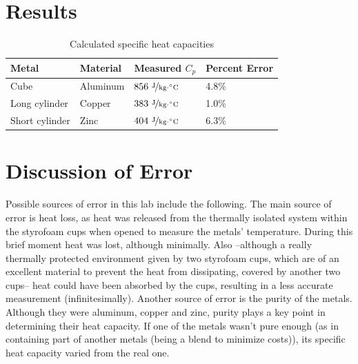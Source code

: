 \documentclass{article}
\begin{document}
\section{Results}

\begin{table}[htbp]
\begin{center}
\footnotesize
\begin{tabular}{llll}
\toprule
 Metal  & Material  & Measured $C_p$ & Percent Error\\                                                      
\midrule
  
    Cube    & Aluminum   & $856\   \nicefrac{ \text{J}}{\text{kg}\cdot {}^{\circ}\text{C}}$ &   4.8\%   \\
    Long cylinder   & Copper     & $383\   \nicefrac{ \text{J}}{\text{kg}\cdot {}^{\circ}\text{C}}$   & 1.0\%   \\
    Short cylinder  & Zinc     & $404\  \nicefrac{ \text{J}}{\text{kg}\cdot {}^{\circ}\text{C}}$  & 6.3\%   \\
    
\bottomrule
\end{tabular}
\end{center}
  \caption{Calculated specific heat capacities}
  \label{tab:font-sizes}
\end{table}


 

\section{Discussion of Error}
Possible sources of error in this lab include the following. 
The main source of error is heat loss, as heat was released from the thermally isolated system within the styrofoam cups when opened to measure the metals' temperature. During this brief moment heat was lost, although minimally. Also –although a really thermally protected environment given by two styrofoam cups, which are of an excellent material to prevent the heat from dissipating, covered by another two cups– heat could have been absorbed by the cups, resulting in a less accurate measurement (infinitesimally).  
Another source of error is the purity of the metals. Although they were aluminum, copper and zinc, purity plays a key point in determining their heat capacity. If one of the metals wasn't pure enough (as in containing part of another metals (being a blend to minimize costs)), its specific heat capacity varied from the real one. 
\end{document}
